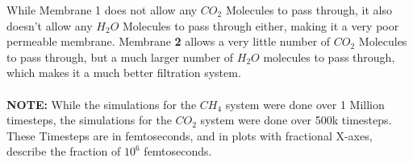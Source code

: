 \documentclass[11pt]{article}
\begin{document}
While Membrane 1 does not allow any $CO_2$ Molecules to pass through, it also doesn't allow any $H_2O$ Molecules to pass through either, making it a very poor permeable membrane. Membrane \textbf{2} allows a very little number of $CO_2$ Molecules to pass through, but a much larger number of $H_2O$ molecules to pass through, which makes it a much better filtration system. \\ \\
\textbf{NOTE:} While the simulations for the $CH_4$ system were done over 1 Million timesteps, the simulations for the $CO_2$ system were done over 500k timesteps. These Timesteps are in femtoseconds, and in plots with fractional X-axes, describe the fraction of $10^6$ femtoseconds.
\end{document}

